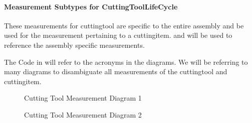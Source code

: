 \documentclass{mtconnect}	%
\begin{document}
\paragraph{Measurement Subtypes for CuttingToolLifeCycle}\mbox{}

These measurements for \gls{cuttingtool} are specific to the entire assembly and \MUSTNOT be used for the measurement pertaining to a \gls{cuttingitem}.  and  will be used to reference the assembly specific measurements.

The Code in  will refer to the acronyms in the diagrams. We will be referring to many diagrams to disambiguate all measurements of the \gls{cuttingtool} and \gls{cuttingitem}. 

\begin{figure}[ht]
  \centering
  \caption{Cutting Tool Measurement Diagram 1}
  \label{fig:cutting-tool-measurement-1}
\end{figure}

\FloatBarrier

\begin{figure}[ht]
  \centering
  \caption{Cutting Tool Measurement Diagram 2}
  \label{fig:cutting-tool-measurement-2}
\end{figure}
\end{document}
